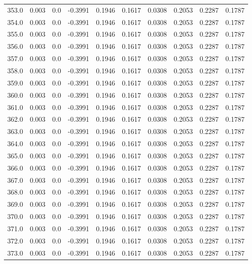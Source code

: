 \begin{longtable}{lrrrrrrrrr}
353.0 & 0.003 & 0.0 & -0.3991 & 0.1946 & 0.1617 & 0.0308 & 0.2053 & 0.2287 & 0.1787 \\
354.0 & 0.003 & 0.0 & -0.3991 & 0.1946 & 0.1617 & 0.0308 & 0.2053 & 0.2287 & 0.1787 \\
355.0 & 0.003 & 0.0 & -0.3991 & 0.1946 & 0.1617 & 0.0308 & 0.2053 & 0.2287 & 0.1787 \\
356.0 & 0.003 & 0.0 & -0.3991 & 0.1946 & 0.1617 & 0.0308 & 0.2053 & 0.2287 & 0.1787 \\
357.0 & 0.003 & 0.0 & -0.3991 & 0.1946 & 0.1617 & 0.0308 & 0.2053 & 0.2287 & 0.1787 \\
358.0 & 0.003 & 0.0 & -0.3991 & 0.1946 & 0.1617 & 0.0308 & 0.2053 & 0.2287 & 0.1787 \\
359.0 & 0.003 & 0.0 & -0.3991 & 0.1946 & 0.1617 & 0.0308 & 0.2053 & 0.2287 & 0.1787 \\
360.0 & 0.003 & 0.0 & -0.3991 & 0.1946 & 0.1617 & 0.0308 & 0.2053 & 0.2287 & 0.1787 \\
361.0 & 0.003 & 0.0 & -0.3991 & 0.1946 & 0.1617 & 0.0308 & 0.2053 & 0.2287 & 0.1787 \\
362.0 & 0.003 & 0.0 & -0.3991 & 0.1946 & 0.1617 & 0.0308 & 0.2053 & 0.2287 & 0.1787 \\
363.0 & 0.003 & 0.0 & -0.3991 & 0.1946 & 0.1617 & 0.0308 & 0.2053 & 0.2287 & 0.1787 \\
364.0 & 0.003 & 0.0 & -0.3991 & 0.1946 & 0.1617 & 0.0308 & 0.2053 & 0.2287 & 0.1787 \\
365.0 & 0.003 & 0.0 & -0.3991 & 0.1946 & 0.1617 & 0.0308 & 0.2053 & 0.2287 & 0.1787 \\
366.0 & 0.003 & 0.0 & -0.3991 & 0.1946 & 0.1617 & 0.0308 & 0.2053 & 0.2287 & 0.1787 \\
367.0 & 0.003 & 0.0 & -0.3991 & 0.1946 & 0.1617 & 0.0308 & 0.2053 & 0.2287 & 0.1787 \\
368.0 & 0.003 & 0.0 & -0.3991 & 0.1946 & 0.1617 & 0.0308 & 0.2053 & 0.2287 & 0.1787 \\
369.0 & 0.003 & 0.0 & -0.3991 & 0.1946 & 0.1617 & 0.0308 & 0.2053 & 0.2287 & 0.1787 \\
370.0 & 0.003 & 0.0 & -0.3991 & 0.1946 & 0.1617 & 0.0308 & 0.2053 & 0.2287 & 0.1787 \\
371.0 & 0.003 & 0.0 & -0.3991 & 0.1946 & 0.1617 & 0.0308 & 0.2053 & 0.2287 & 0.1787 \\
372.0 & 0.003 & 0.0 & -0.3991 & 0.1946 & 0.1617 & 0.0308 & 0.2053 & 0.2287 & 0.1787 \\
373.0 & 0.003 & 0.0 & -0.3991 & 0.1946 & 0.1617 & 0.0308 & 0.2053 & 0.2287 & 0.1787 \\

\end{longtable}
